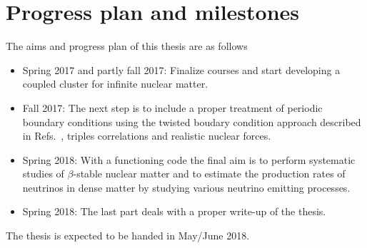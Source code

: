 \documentclass[aps,prc,twocolumn,showpacs,floatfix,nofootinbib,preprintnumbers,superscriptaddress,amsmath,amssymb]{revtex4-1}
\begin{document}
\section*{Progress plan and milestones}
The aims and progress plan of this thesis are as follows
\begin{itemize}
\item Spring 2017 and partly fall 2017:  Finalize courses and start developing a coupled cluster for infinite nuclear matter. 
\item Fall 2017:  The next step is to include a proper treatment of periodic boundary conditions using the twisted boudary condition
approach described in Refs.~\cite{gros1992,gros1996,lin2001}, triples correlations and realistic nuclear forces.
\item Spring 2018: With a functioning code the final aim is to perform systematic studies of  $\beta$-stable nuclear matter and to estimate the production rates of neutrinos in dense matter by studying various neutrino emitting processes. 
\item Spring 2018: The last part deals with a proper write-up of the thesis. 
\end{itemize}
 
The thesis is expected to be handed in May/June 2018.
\end{document}
